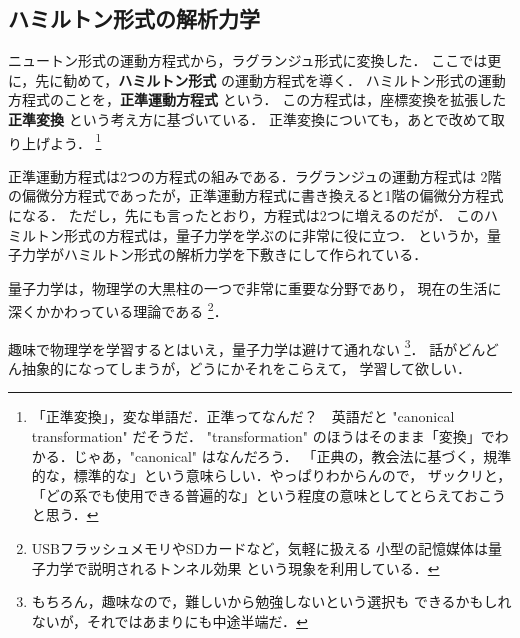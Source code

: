         \subsection{ハミルトン形式の解析力学}
                \begin{mycomment}
                    ニュートン形式の運動方程式から，ラグランジュ形式に変換した．
                    ここでは更に，先に勧めて，\textbf{ハミルトン形式} の運動方程式を導く．
                    ハミルトン形式の運動方程式のことを，\textbf{正準運動方程式} という．
                    この方程式は，座標変換を拡張した\textbf{正準変換} という考え方に基づいている．
                    正準変換についても，あとで改めて取り上げよう．
                        \footnote{
                            「正準変換」，変な単語だ．正準ってなんだ？　英語だと "canonical transformation" だそうだ．
                            "transformation" のほうはそのまま「変換」でわかる．じゃあ，"canonical" はなんだろう．
                            「正典の，教会法に基づく，規準的な，標準的な」という意味らしい．やっぱりわからんので，
                            ザックリと，「どの系でも使用できる普遍的な」という程度の意味としてとらえておこうと思う．
                        }

                    正準運動方程式は2つの方程式の組みである．ラグランジュの運動方程式は
                    2階の偏微分方程式であったが，正準運動方程式に書き換えると1階の偏微分方程式になる．
                    ただし，先にも言ったとおり，方程式は2つに増えるのだが．
                    このハミルトン形式の方程式は，量子力学を学ぶのに非常に役に立つ．
                    というか，量子力学がハミルトン形式の解析力学を下敷きにして作られている．

                    量子力学は，物理学の大黒柱の一つで非常に重要な分野であり，
                    現在の生活に深くかかわっている理論である
                        \footnote{
                            USBフラッシュメモリやSDカードなど，気軽に扱える
                            小型の記憶媒体は量子力学で説明されるトンネル効果
                            という現象を利用している．
                        }．


                    趣味で物理学を学習するとはいえ，量子力学は避けて通れない
                        \footnote{
                            もちろん，趣味なので，難しいから勉強しないという選択も
                            できるかもしれないが，それではあまりにも中途半端だ．
                        }．
                    話がどんどん抽象的になってしまうが，どうにかそれをこらえて，
                    学習して欲しい．
                \end{mycomment}


